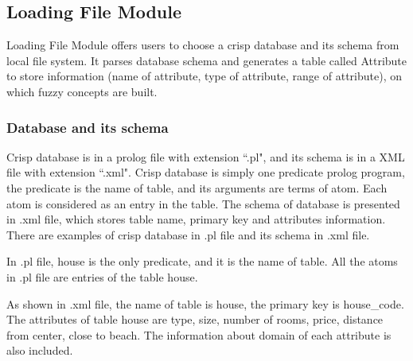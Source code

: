 \subsection{Loading File Module}
\label{sec:LoadingFileModule}
Loading File Module offers users to choose a crisp database and its schema from local file system.
It parses database schema and generates  a table called Attribute to store information (name of attribute, type of attribute, range of attribute), on which fuzzy concepts are built.

\subsubsection{Database and its schema}
Crisp database is in a prolog file with extension ``.pl", and its schema is in a XML file with extension ``.xml". Crisp database is simply one predicate prolog program, the predicate is the name of table, and its arguments are terms of atom. Each atom is considered as an entry in the table. The schema of database is presented in .xml file, which stores table name, primary key and attributes information.
There are examples of crisp database in .pl file and its schema in .xml file.

\begin{ex}
In .pl file, house is the only predicate, and it is the name of table. All the atoms in .pl file are entries of the table house.

\end{ex}

\begin{ex}
As shown in .xml file, the name of table is house, the primary key is house\_code. The attributes of table house are type, size, number of rooms, price, distance from center, close to beach. The information about domain of each attribute is also included.

\end{ex}

